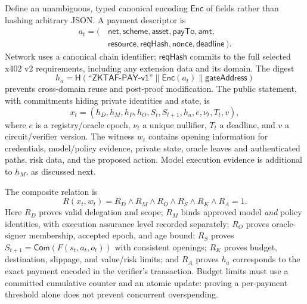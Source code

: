 \documentclass[conference]{IEEEtran}
\newcommand{\Com}{\mathsf{Com}}
\newcommand{\Hh}{\mathsf{H}}
\begin{document}
Define an unambiguous, typed canonical encoding \(\mathsf{Enc}\) of fields rather than hashing arbitrary JSON. A payment descriptor is
\begin{equation}
\begin{aligned}
 a_t=(\,&\textsf{net},\textsf{scheme},\textsf{asset},\textsf{payTo},\textsf{amt},\\
      &\textsf{resource},\textsf{reqHash},\textsf{nonce},\textsf{deadline}\,).
\end{aligned}
 \label{eq:action}
\end{equation}
Network uses a canonical chain identifier; \(\textsf{reqHash}\) commits to the full selected x402 v2 requirements, including any extension data and its domain. The digest
\begin{equation}
 h_a=\Hh(\textsf{``ZKTAF-PAY-v1''}\parallel\mathsf{Enc}(a_t)\parallel\textsf{gateAddress})
 \label{eq:hash}
\end{equation}
prevents cross-domain reuse and post-proof modification. The public statement, with commitments hiding private identities and state, is
\begin{equation}
 x_t=(h_D,h_M,h_P,h_O,S_t,S_{t+1},h_a,e,\nu_t,T_t,v),
 \label{eq:public}
\end{equation}
where \(e\) is a registry/oracle epoch, \(\nu_t\) a unique nullifier, \(T_t\) a deadline, and \(v\) a circuit/verifier version. The witness \(w_t\) contains opening information for credentials, model/policy evidence, private state, oracle leaves and authenticated paths, risk data, and the proposed action. Model execution evidence is additional to \(h_M\), as discussed next.

The composite relation is
\begin{equation}
 R(x_t,w_t)=R_D\land R_M\land R_O\land R_S\land R_K\land R_A=1.
 \label{eq:relation}
\end{equation}
Here \(R_D\) proves valid delegation and scope; \(R_M\) binds approved model \emph{and} policy identities, with execution assurance level recorded separately; \(R_O\) proves oracle-signer membership, accepted epoch, and age bound; \(R_S\) proves \(S_{t+1}=\Com(F(s_t,a_t,o_t))\) with consistent openings; \(R_K\) proves budget, destination, slippage, and value/risk limits; and \(R_A\) proves \(h_a\) corresponds to the exact payment encoded in the verifier's transaction. Budget limits must use a committed cumulative counter and an atomic update: proving a per-payment threshold alone does not prevent concurrent overspending.
\end{document}
